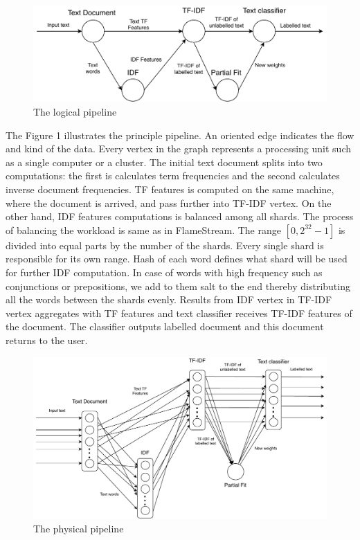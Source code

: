 \begin{figure}[htbp]
  \centering
  \includegraphics[scale=0.45]{pics/logical-graph}
  \caption{The logical pipeline}
  \label {logical graph}
\end{figure}

The Figure 1 illustrates the principle pipeline. An oriented edge indicates the flow and kind of the data. Every vertex in the graph represents a processing unit such as a single computer or a cluster. The initial text document splits into two computations: the first is calculates term frequencies and the second calculates inverse document frequencies. TF features is computed on the same machine, where the document is arrived, and pass further into TF-IDF vertex. On the other hand, IDF features computations is balanced among all shards. The process of balancing the workload is same as in FlameStream. The range $[0, 2^{32} - 1]$ is divided into equal parts by the number of the shards. Every single shard is responsible for its own range. Hash of each word defines what shard will be used for further IDF computation. In case of words with high frequency such as conjunctions or prepositions, we add to them salt to the end thereby distributing all the words between the shards evenly. Results from IDF vertex in TF-IDF vertex aggregates with TF features and text classifier receives TF-IDF features of the document. The classifier outputs labelled document and this document returns to the user.

\begin{figure}[htbp]
  \centering
  \includegraphics[scale=0.375]{pics/physical-graph}
  \caption{The physical pipeline}
  \label {physical graph}
\end{figure}

